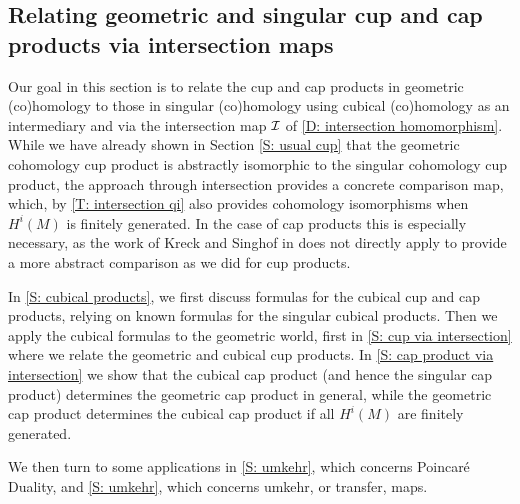\begin{comment}
	\begin{theorem}
		Let $M$ and $N$ be manifolds.
		Then the geometric cohomology cross product $H^i_\Gamma(M) \otimes H^j_\Gamma(N) \to H^{i+j}_\Gamma(M \times N)$ is isomorphic to the singular cohomology cross product $H^i(M) \otimes H^j(N) \to H^{i+j}(M \times N)$.
	\end{theorem}

	\begin{proof}
		NEED MORE GENERAL INTERSECTION MAP THEOREM OR TO RESTRICT TO COMPACT MANIFOLDS

	\end{proof}
\end{comment}

\subsection{Relating geometric and singular cup and cap products via intersection maps}\label{S: cubical cup and cap}

Our goal in this section is to relate the cup and cap products in geometric (co)homology to those in singular (co)homology using cubical (co)homology as an intermediary and via the intersection map $\mathcal{I}$ of \cref{D: intersection homomorphism}.
While we have already shown in Section \cref{S: usual cup} that the geometric cohomology cup product is abstractly isomorphic to the singular cohomology cup product, the approach through intersection provides a concrete comparison map, which, by \cref{T: intersection qi} also provides cohomology isomorphisms when $H^i(M)$ is finitely generated.
In the case of cap products this is especially necessary, as the work of Kreck and Singhof in \cite{Krec10b} does not directly apply to provide a more abstract comparison as we did for cup products.

In \cref{S: cubical products}, we first discuss formulas for the cubical cup and cap products, relying on known formulas for the singular cubical products. Then we apply the cubical formulas to the geometric world, first in \cref{S: cup via intersection} where we relate the geometric and cubical cup products.
In \cref{S: cap product via intersection} we show that the cubical cap product (and hence the singular cap product) determines the geometric cap product in general, while the geometric cap product determines the cubical cap product if all $H^i(M)$ are finitely generated.

We then turn to some applications in \cref{S: umkehr}, which concerns Poincar\'e Duality, and \cref{S: umkehr}, which concerns umkehr, or transfer, maps.

